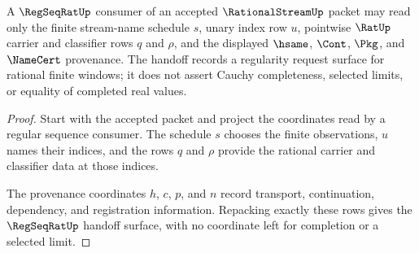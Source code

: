 \begin{theorem}
\label{thm:rational-stream-regseqrat-handoff}
A $\RegSeqRatUp$ consumer of an accepted $\RationalStreamUp$ packet may read
only the finite stream-name schedule $s$, unary index row $u$, pointwise
$\RatUp$ carrier and classifier rows $q$ and $\rho$, and the displayed
$\hsame$, $\Cont$, $\Pkg$, and $\NameCert$ provenance. The handoff records a
regularity request surface for rational finite windows; it does not assert
Cauchy completeness, selected limits, or equality of completed real values.
\end{theorem}
\begin{proof}
Start with the accepted packet and project the coordinates read by a regular
sequence consumer. The schedule $s$ chooses the finite observations, $u$
names their indices, and the rows $q$ and $\rho$ provide the rational carrier
and classifier data at those indices.

The provenance coordinates $h$, $c$, $p$, and $n$ record transport,
continuation, dependency, and registration information. Repacking exactly
these rows gives the $\RegSeqRatUp$ handoff surface, with no coordinate left
for completion or a selected limit.
\end{proof}

